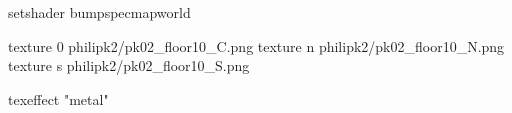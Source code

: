 setshader bumpspecmapworld

texture 0 philipk2/pk02_floor10_C.png
texture n philipk2/pk02_floor10_N.png
texture s philipk2/pk02_floor10_S.png

texeffect "metal"

